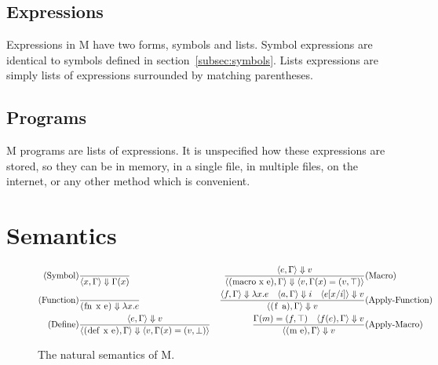 \documentclass{article}
\begin{document}
\begin{multicols}{2}
        \subsection{Expressions}\label{subsec:expressions}

        \begin{minipage}{\columnwidth}
            Expressions in M have two forms, symbols and lists.
            Symbol expressions are identical to symbols defined in section~\ref{subsec:symbols}.
            Lists expressions are simply lists of expressions surrounded by matching parentheses.
        \end{minipage}

        \subsection{Programs}\label{subsec:programs}

        \begin{minipage}{\columnwidth}
            M programs are lists of expressions.
            It is unspecified how these expressions are stored, so they can be in memory, in a single file, in multiple files, on the internet, or any other method which is convenient.
        \end{minipage}
    \end{multicols}
    \newpage

    \section{Semantics}\label{sec:semantics}

    \begin{figure}[h]
        \centering
        \begin{align*}
            \text{(Symbol)}&\dfrac{}{\langle x,\Gamma\rangle\Downarrow\Gamma(x)}
            &\dfrac{\langle e,\Gamma\rangle\Downarrow v}{\langle\lstinline$(macro x e)$,\Gamma\rangle\Downarrow\langle v,\Gamma(x) = (v,\top)\rangle}&\text{(Macro)}\\
            \text{(Function)}&\dfrac{}{\lstinline$(fn x e)$\Downarrow\lambda x.e}
            &\dfrac{\langle f,\Gamma\rangle\Downarrow\lambda x.e\quad\langle a,\Gamma\rangle\Downarrow i\quad\langle e[x/i]\rangle\Downarrow v}{\langle\lstinline$(f a)$,\Gamma\rangle\Downarrow v}&\text{(Apply-Function)}\\
            \text{(Define)}&\dfrac{\langle e,\Gamma\rangle\Downarrow v}{\langle\lstinline$(def x e)$,\Gamma\rangle\Downarrow\langle v,\Gamma(x) = (v,\bot)\rangle}
            &\dfrac{\Gamma(m)=(f,\top)\quad\langle f(e),\Gamma\rangle\Downarrow v}{\langle\lstinline$(m e)$,\Gamma\rangle\Downarrow v}&\text{(Apply-Macro)}
        \end{align*}
        \caption{The natural semantics of M.}
    \end{figure}
\end{document}

